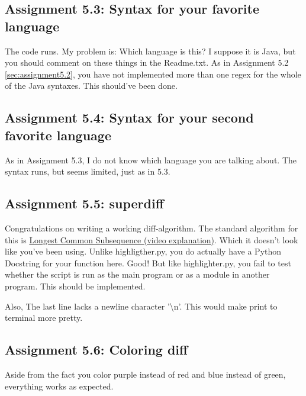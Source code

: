 \documentclass[a4paper]{article}
\begin{document}
\subsection*{Assignment 5.3: Syntax for your favorite language}
The code runs. My problem is: Which language is this? I suppose it is Java, but you should comment on these things in the Readme.txt. 
As in Assignment 5.2 \ref{sec:assignment5.2}, you have not implemented more than one regex for the whole of the Java syntaxes. This should've been done.

\subsection*{Assignment 5.4: Syntax for your second favorite language}
As in Assignment 5.3, I do not know which language you are talking about. The syntax runs, but seems limited, just as in 5.3.
\subsection*{Assignment 5.5: superdiff}
Congratulations on writing a working diff-algorithm. The standard algorithm for this is \href{https://www.youtube.com/watch?v=NnD96abizww}{Longest Common Subsequence (video explanation)}. Which it doesn't look like you've been using.
Unlike highligther.py, you do actually have a Python Docstring for your function here. Good! But like highlighter.py, you fail to test whether the script is run as the main program or as a module in another program. This should be implemented.

Also, The last line lacks a newline character '\textbackslash n'. This would make print to terminal more pretty.
\subsection*{Assignment 5.6:  Coloring diff}
Aside from the fact you color purple instead of red and blue instead of green, everything works as expected.





\end{document}
